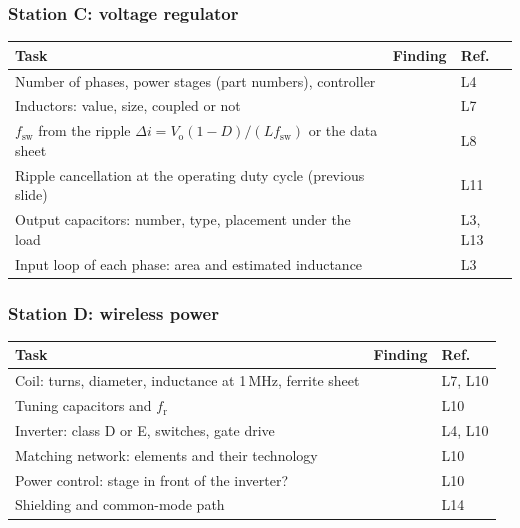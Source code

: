 \begin{frame}
	\frametitle{Station C: voltage regulator}
	\footnotesize
	\renewcommand{\arraystretch}{1.5}
	\begin{tabular}{|>{\raggedright\arraybackslash}p{6.2cm}|p{6.6cm}|l|}
		\hline
		\textbf{Task}                                                                  & \textbf{Finding} & \textbf{Ref.} \\
		\hline
		Number of phases, power stages (part numbers), controller                      &                  & L4            \\
		Inductors: value, size, coupled or not                                         &                  & L7            \\
		$f_\mathrm{sw}$ from the ripple $\Delta i=V_\mathrm{o}(1-D)/(Lf_\mathrm{sw})$ or the data sheet &   & L8            \\
		Ripple cancellation at the operating duty cycle (previous slide)              &                  & L11           \\
		Output capacitors: number, type, placement under the load                      &                  & L3, L13       \\
		Input loop of each phase: area and estimated inductance                       &                  & L3            \\
		\hline
	\end{tabular}
\end{frame}

\begin{frame}
	\frametitle{Station D: wireless power}
	\footnotesize
	\renewcommand{\arraystretch}{1.5}
	\begin{tabular}{|>{\raggedright\arraybackslash}p{6.2cm}|p{6.6cm}|l|}
		\hline
		\textbf{Task}                                                                  & \textbf{Finding} & \textbf{Ref.} \\
		\hline
		Coil: turns, diameter, inductance at 1\,MHz, ferrite sheet                     &                  & L7, L10       \\
		Tuning capacitors and $f_\mathrm{r}$                                           &                  & L10           \\
		Inverter: class D or E, switches, gate drive                                   &                  & L4, L10       \\
		Matching network: elements and their technology                                &                  & L10           \\
		Power control: stage in front of the inverter?                                 &                  & L10           \\
		Shielding and common-mode path                                                 &                  & L14           \\
		\hline
	\end{tabular}
\end{frame}

